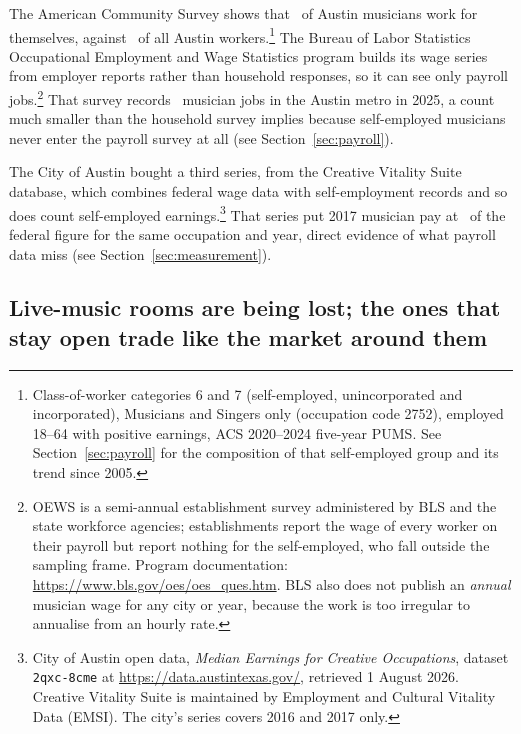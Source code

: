 The American Community Survey shows that \NPumsAustinMusSelfemp\ of Austin
musicians work for themselves, against \NPumsAustinAllworkSelfemp\ of all
Austin workers.\footnote{Class-of-worker categories 6 and 7 (self-employed,
unincorporated and incorporated), Musicians and Singers only (occupation code
2752), employed 18--64 with positive earnings, ACS 2020--2024 five-year PUMS.
See Section~\ref{sec:payroll} for the composition of that self-employed group
and its trend since 2005.} The Bureau of Labor Statistics Occupational
Employment and Wage Statistics program builds its wage series from employer
reports rather than household responses, so it can see only payroll
jobs.\footnote{OEWS is a semi-annual establishment survey administered by BLS
and the state workforce agencies; establishments report the wage of every
worker on their payroll but report nothing for the self-employed, who fall
outside the sampling frame. Program documentation:
\url{https://www.bls.gov/oes/oes_ques.htm}. BLS also does not publish an
\emph{annual} musician wage for any city or year, because the work is too
irregular to annualise from an hourly rate.} That survey records
\NEmpPayrollMusiciansAustinLast\ musician jobs in the Austin metro in 2025, a
count much smaller than the household survey implies because self-employed
musicians never enter the payroll survey at all (see Section~\ref{sec:payroll}).

The City of Austin bought a
third series, from the Creative Vitality Suite database, which combines federal
wage data with self-employment records and so does count self-employed
earnings.\footnote{City of Austin open data,
\textit{Median Earnings for Creative Occupations}, dataset
\texttt{2qxc-8cme} at \url{https://data.austintexas.gov/}, retrieved 1 August
2026. Creative Vitality Suite is maintained by Employment and Cultural Vitality
Data (EMSI). The city's series covers 2016 and 2017 only.} That series put 2017
musician pay at \NColAnchorCityWageVsOewsTwoZeroOneSeven\ of the federal figure
for the same occupation and year, direct evidence of what payroll data miss (see Section~\ref{sec:measurement}).

\subsection*{Live-music rooms are being lost; the ones that stay open trade like the market around them}

